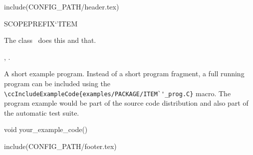 include(CONFIG_PATH/header.tex)
\begin{ccRefClass}SCOPE{PREFIX`'ITEM}  %


\ccDefinition
  
The class \ccRefName\ does this and that.


\ccIsModel


\ccTypes


\ccCreation
{}  %


\ccOperations


\ccSeeAlso

,
.

\ccExample

A short example program.
Instead of a short program fragment, a full running program can be
included using the 
\verb|\ccIncludeExampleCode{examples/PACKAGE/ITEM`'_prog.C}| 
macro. The program example would be part of the source code distribution and
also part of the automatic test suite.

\begin{ccExampleCode}
void your_example_code() {
}
\end{ccExampleCode}


\end{ccRefClass}

include(CONFIG_PATH/footer.tex)
